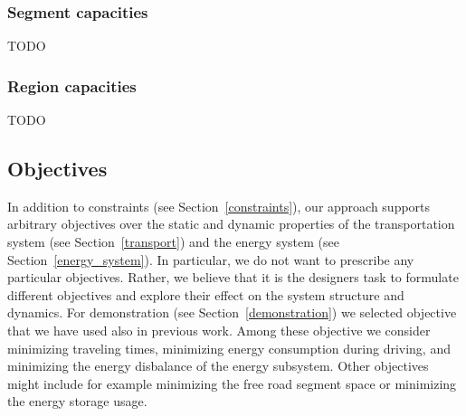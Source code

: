\subsubsection{Segment capacities}
\label{collisions}

TODO


\subsubsection{Region capacities}
\label{capacities}

TODO

\subsection{Objectives}
\label{objectives}

In addition to constraints (see Section~\ref{constraints}), our approach supports arbitrary objectives over the static and dynamic properties of the transportation system (see Section~\ref{transport}) and the energy system (see Section~\ref{energy_system}). In particular, we do not want to prescribe any particular objectives. Rather, we believe that it is the designers task to formulate different objectives and explore their effect on the system structure and dynamics. For demonstration (see Section~\ref{demonstration}) we selected objective that we have used also in previous work. Among these objective we consider minimizing traveling times, minimizing energy consumption during driving, and minimizing the energy disbalance of the energy subsystem. Other objectives might include for example minimizing the free road segment space or minimizing the energy storage usage.